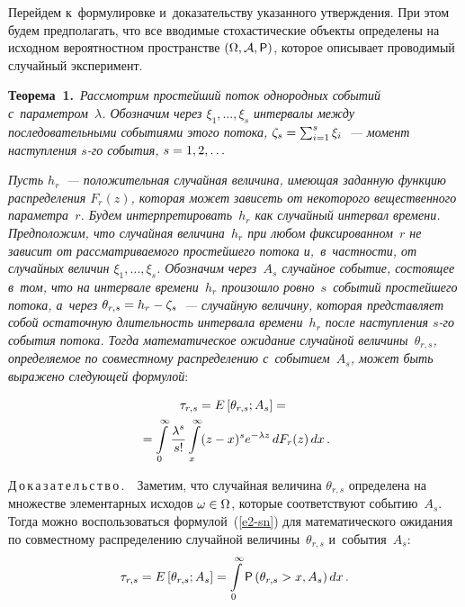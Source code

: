\begin{multicols}{2}
  Перейдем к~формулировке и~доказательству указанного утверж\-де\-ния. При 
этом будем предполагать, что все вводимые сто\-ха\-сти\-че\-ские объекты 
определены на исходном вероятностном про\-стран\-ст\-ве $(\Omega, 
\mathcal{A},{\sf P})$, которое описывает проводимый случайный эксперимент.
  
  \smallskip
  
  \noindent
  \textbf{Теорема~1.}\ \textit{Рассмотрим простейший поток однородных 
событий с~па\-ра\-мет\-ром~$\lambda$. Обозначим через $\xi_1,\ldots , \xi_s$ 
интервалы меж\-ду последовательными событиями этого потока, $\zeta_s\hm= 
\sum\nolimits^s_{i=1} \xi_i$~--- момент на\-ступ\-ле\-ния $s$-го события, 
$s\hm=1,2,\ldots$}
  
  \textit{Пусть $h_r$~--- положительная случайная величина, име\-ющая 
заданную функцию распределения $F_r(z)$, которая может зависеть от 
некоторого вещественного па\-ра\-мет\-ра~$r$. Будем интерпретировать~$h_r$ как 
случайный интервал времени. Предположим, что случайная величина~$h_r$ 
при любом фиксированном~$r$ не зависит от рас\-смат\-ри\-ва\-емо\-го прос\-тей\-ше\-го 
потока и,~в~част\-ности, от случайных величин $\xi_1,\ldots ,\xi_s$. Обозначим 
через~$A_s$ случайное событие, со\-сто\-ящее в~том, что на интервале 
времени~$h_r$ произошло ровно~$s$~событий простейшего потока, а~через 
$\theta_{r,s}\hm= h_r\hm-\zeta_s$~--- случайную величину, которая пред\-став\-ля\-ет 
собой остаточную дли\-тель\-ность интервала времени~$h_r$ после наступления 
$s$-го события потока. Тогда математическое ожидание случайной 
величины~$\theta_{r,s}$, опре\-де\-ля\-емое по совместному распределению 
с~событием~$A_s$, может быть выражено сле\-ду\-ющей формулой}:

\noindent
  \begin{multline}
  \tau_{r,s}=E\left[ \theta_{r,s};A_s\right] ={}\\
  {}=\int\limits_0^\infty \displaystyle\frac{\displaystyle \lambda^s\mathstrut}{\displaystyle s!\mathstrut} 
\int\limits^\infty_x (z-x)^s e^{-\lambda z}\,dF_r(z)\,dx\,.
  \label{e3-sn}
  \end{multline}

\noindent
  Д\,о\,к\,а\,з\,а\,т\,е\,л\,ь\,с\,т\,в\,о\,.\ \ Заметим, что случайная величина 
$\theta_{r,s}$ определена на множестве элементарных исходов $\omega\hm\in 
\Omega$, которые соответствуют событию~$A_s$. Тогда можно 
воспользоваться формулой~(\ref{e2-sn}) для 
математического ожидания по совместному распределению случайной 
величины~$\theta_{r,s}$ и~события~$A_s$:
  \begin{equation}
  \tau_{r,s}=E\left[ \theta_{r,s};A_s\right] =\int\limits_0^\infty 
  {\sf P}\left( \theta_{r,s} > 
x, A_s\right)dx\,.
  \label{e4-sn}
  \end{equation}
  

\end{multicols}
